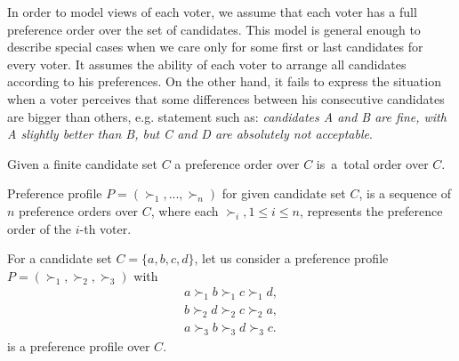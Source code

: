 In order to model views of each voter,
we assume that each voter has a full preference order over the set of candidates.
This model is general enough to describe special cases
when we care only for some first or last candidates for every voter.
It assumes the ability of each voter to arrange all candidates according to his preferences.
On the other hand, it fails to express the situation when a voter perceives that some differences
between his consecutive candidates are bigger than others, e.g. statement such as:
\textit{candidates A and B are fine, with A slightly better than B, but C and D are absolutely not acceptable}.

\begin{defn}
Given a finite candidate set $C$ a preference order over $C$
is~a~total order over $C$.
\end{defn}

\begin{defn}
Preference profile $P = (\succ_1, ... , \succ_n)$ for given candidate set $C$,
is a sequence of $n$ preference orders over $C$,
where each $\succ_i, 1 \leq i \leq n$, represents the preference order of the $i$-th voter.
\end{defn}


\begin{exmp}
For a candidate set $C = \{a, b, c, d\}$,
let us consider a preference profile $P = (\succ_1, \succ_2, \succ_3)$ with
\begin{align*}
a \succ_1 b \succ_1 c \succ_1 d, \\
b \succ_2 d \succ_2 c \succ_2 a,	\\
a \succ_3 b \succ_3 d \succ_3 c.
\end{align*}
is a preference profile over $C$.
\end{exmp}
